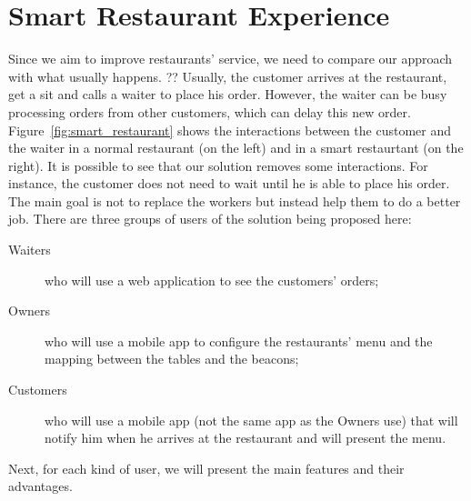 
\section{Smart Restaurant Experience}
\label{sec:smart_restaurant_experience}

Since we aim to improve restaurants' service, we need to compare our approach
with what usually happens. ??
Usually, the customer arrives at the restaurant, get a sit and calls a waiter
to place his order. However, the waiter can be busy processing orders
from other customers, which can delay this new order.
Figure~\ref{fig:smart_restaurant} shows the interactions between the
customer and the waiter in a normal restaurant (on the left) and in
a smart restaurtant (on the right). It is possible to see that our
solution removes some interactions. For instance, the customer does not
need to wait until he is able to place his order.
The main goal is not to replace the workers but instead help them to do a
better job.
There are three groups of users of the solution being proposed here:

\begin{description}
  \item[Waiters] who will use a web application to see the customers'
  orders;
  \item[Owners] who will use a mobile app to configure the
  restaurants' menu and the mapping between the tables and the beacons;
  \item[Customers] who will use a mobile app (not the same app as the
  Owners use) that will notify him when he arrives at the restaurant and
  will present the menu.
\end{description}

Next, for each kind of user, we will present the main features and their
advantages.

